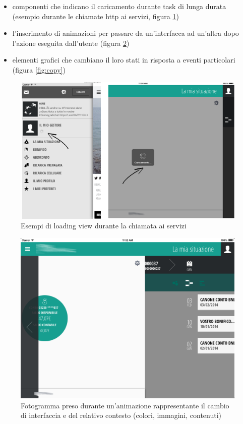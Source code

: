 \begin{itemize}
 \item componenti che indicano il caricamento durante task di lunga durata (esempio durante le chiamate http ai servizi, figura \ref{fig:loading})
 \item l'inserimento di animazioni per passare da un'interfacca ad un'altra dopo l'azione eseguita dall'utente (figura \ref{fig:animation})
 \item elementi grafici che cambiano il loro stati in risposta a eventi particolari (figura \ref{fig:copy})

\end{itemize}


\begin{figure}[htbp]
\centering
\includegraphics[scale=0.30]{ux/loading.png}
\caption{Esempi di loading view durante la chiamata ai servizi}
\label{fig:loading}
\end{figure}

\begin{figure}[htbp]
\centering
\includegraphics[scale=0.30]{ux/animazione.png}
\caption{Fotogramma preso durante un'animazione rappresentante il cambio di interfaccia e del relativo contesto (colori, immagini, contenuti)}
\label{fig:animation}
\end{figure}


